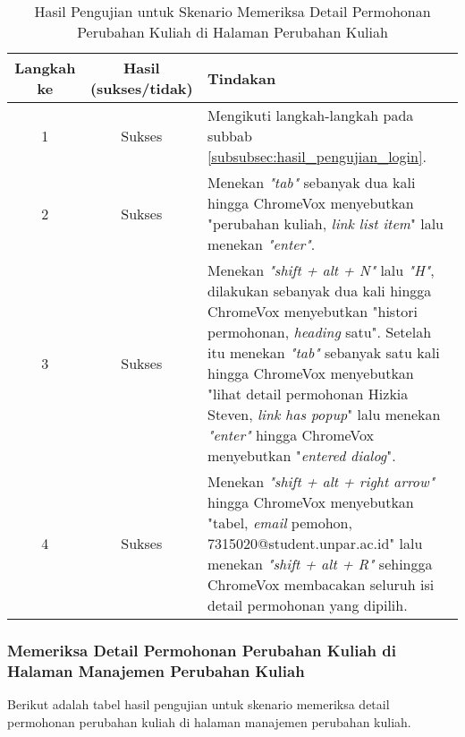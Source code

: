 \begin{table}[H]
    \centering 
    \caption{Hasil Pengujian untuk Skenario Memeriksa Detail Permohonan Perubahan Kuliah di Halaman Perubahan Kuliah}
    \label{tab:hasil_pengujian_memeriksa_detail_permohonan_perubahan_kuliah_di_halaman_perubahan_kuliah}
    \begin{tabular}{|c|c|p{10cm}|}
        \toprule
        Langkah ke & Hasil (sukses/tidak) & Tindakan \\

        \midrule
        1 & Sukses & Mengikuti langkah-langkah pada subbab \ref{subsubsec:hasil_pengujian_login}. \\
        2 & Sukses & Menekan \textit{"tab"} sebanyak dua kali hingga ChromeVox menyebutkan "perubahan kuliah, \textit{link list item}" lalu menekan \textit{"enter"}. \\
        3 & Sukses & Menekan \textit{"shift + alt + N"} lalu \textit{"H"}, dilakukan sebanyak dua kali hingga ChromeVox menyebutkan "histori permohonan, \textit{heading} satu". Setelah itu menekan \textit{"tab"} sebanyak satu kali hingga ChromeVox menyebutkan "lihat detail permohonan Hizkia Steven, \textit{link has popup}" lalu menekan \textit{"enter"} hingga ChromeVox menyebutkan "\textit{entered dialog}". \\
        4 & Sukses & Menekan \textit{"shift + alt + right arrow"} hingga ChromeVox menyebutkan "tabel, \textit{email} pemohon, 7315020@student.unpar.ac.id" lalu menekan \textit{"shift + alt + R"} sehingga ChromeVox membacakan seluruh isi detail permohonan yang dipilih. \\

        \bottomrule

    \end{tabular}
\end{table}

\subsubsection{Memeriksa Detail Permohonan Perubahan Kuliah di Halaman Manajemen Perubahan Kuliah}
\label{subsubsec:hasil_pengujian_memeriksa_detail_permohonan_perubahan_kuliah_di_halaman_manajemen_perubahan_kuliah}
Berikut adalah tabel hasil pengujian untuk skenario memeriksa detail permohonan perubahan kuliah di halaman manajemen perubahan kuliah.

